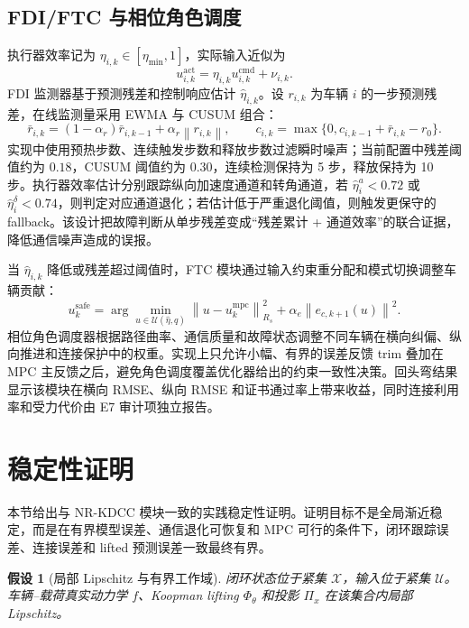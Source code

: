 \documentclass[twocolumn,3p,times,procedia]{elsarticle}
\newcommand{\Method}{NR-KDCC}
\newcommand{\norm}[1]{\left\lVert #1 \right\rVert}
\newtheorem{assumption}{假设}
\begin{document}
\subsection{FDI/FTC 与相位角色调度}

执行器效率记为 $\eta_{i,k}\in[\eta_{\min},1]$，实际输入近似为
\begin{equation}
u_{i,k}^{\mathrm{act}}=\eta_{i,k}u_{i,k}^{\mathrm{cmd}}+\nu_{i,k}.
\label{eq:actuator_efficiency}
\end{equation}
FDI 监测器基于预测残差和控制响应估计 $\hat\eta_{i,k}$。设 $r_{i,k}$ 为车辆 $i$ 的一步预测残差，在线监测量采用 EWMA 与 CUSUM 组合：
\begin{equation}
\bar r_{i,k}=(1-\alpha_r)\bar r_{i,k-1}+\alpha_r\norm{r_{i,k}},\qquad
c_{i,k}=\max\{0,c_{i,k-1}+\bar r_{i,k}-r_0\}.
\label{eq:fdi_ewma_cusum}
\end{equation}
实现中使用预热步数、连续触发步数和释放步数过滤瞬时噪声；当前配置中残差阈值约为 $0.18$，CUSUM 阈值约为 $0.30$，连续检测保持为 5 步，释放保持为 10 步。执行器效率估计分别跟踪纵向加速度通道和转角通道，若 $\hat\eta^a_i<0.72$ 或 $\hat\eta^\delta_i<0.74$，则判定对应通道退化；若估计低于严重退化阈值，则触发更保守的 fallback。该设计把故障判断从单步残差变成“残差累计 + 通道效率”的联合证据，降低通信噪声造成的误报。

当 $\hat\eta_{i,k}$ 降低或残差超过阈值时，FTC 模块通过输入约束重分配和模式切换调整车辆贡献：
\begin{equation}
u_k^\mathrm{safe}=\arg\min_{u\in\mathcal U(\hat\eta,q)}
\norm{u-u_k^\mathrm{mpc}}_{R_s}^2+
\alpha_e\norm{e_{c,k+1}(u)}^2 .
\label{eq:ftc_projection}
\end{equation}
相位角色调度器根据路径曲率、通信质量和故障状态调整不同车辆在横向纠偏、纵向推进和连接保护中的权重。实现上只允许小幅、有界的误差反馈 trim 叠加在 MPC 主反馈之后，避免角色调度覆盖优化器给出的约束一致性决策。回头弯结果显示该模块在横向 RMSE、纵向 RMSE 和证书通过率上带来收益，同时连接利用率和受力代价由 E7 审计项独立报告。

\section{稳定性证明}

本节给出与 \Method{} 模块一致的实践稳定性证明。证明目标不是全局渐近稳定，而是在有界模型误差、通信退化可恢复和 MPC 可行的条件下，闭环跟踪误差、连接误差和 lifted 预测误差一致最终有界。

\begin{assumption}[局部 Lipschitz 与有界工作域]
闭环状态位于紧集 $\mathcal X$，输入位于紧集 $\mathcal U$。车辆--载荷真实动力学 $f$、Koopman lifting $\Phi_\theta$ 和投影 $\Pi_x$ 在该集合内局部 Lipschitz。
\end{assumption}
\end{document}
